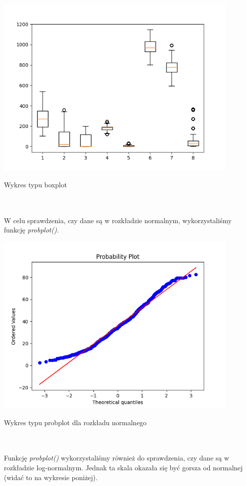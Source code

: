 \documentclass[11pt, a4paper, notitlepage]{report}
\begin{document}
\begin{center}
	\small
	\includegraphics[width=0.9\textwidth]{graphics/data_analysis/boxplot}
	\caption{Wykres typu boxplot}
\end{center}
\\ \\
W celu sprawdzenia, czy dane są w rozkładzie normalnym, wykorzystaliśmy funkcję \textit{probplot()}.
\\
\begin{center}
	\small
	\includegraphics[width=0.9\textwidth]{graphics/data_analysis/probplot}
	\caption{Wykres typu probplot dla rozkładu normalnego}
\end{center}
\\ \\
Funkcję \textit{probplot()} wykorzystaliśmy również do sprawdzenia, czy dane są w rozkładzie log-normalnym. Jednak ta skala okazała się być gorsza od normalnej (widać to na wykresie poniżej).
\end{document}
